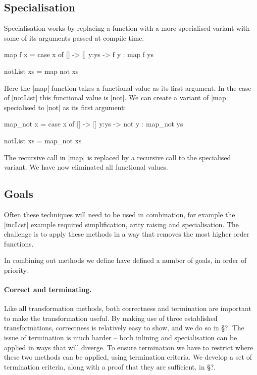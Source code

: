 \documentclass[preprint]{sigplanconf}
\begin{document}
\subsection{Specialisation}

Specialisation works by replacing a function with a more specialised variant with some of its arguments passed at compile time.

\begin{example}
\begin{code}
map f x = case  x of
                []    -> []
                y:ys  -> f y : map f ys

notList xs = map not xs
\end{code}

Here the |map| function takes a functional value as its first argument. In the case of |notList| this functional value is |not|. We can create a variant of |map| specialised to |not| as its first argument:

\begin{code}
map_not x = case  x of
                  []    -> []
                  y:ys  -> not y : map_not ys

notList xs = map_not xs
\end{code}

The recursive call in |map| is replaced by a recursive call to the specialised variant. We have now eliminated all functional values.
\end{example}

\subsection{Goals}

Often these techniques will need to be used in combination, for example the |incList| example required simplification, arity raising and specialisation. The challenge is to apply these methods in a way that removes the most higher order functions.

In combining out methods we define have defined a number of goals, in order of priority.

\paragraph{Correct and terminating.} Like all transformation methods, both correctness and termination are important to make the transformation useful. By making use of three established transformations, correctness is relatively easy to show, and we do so in \S?. The issue of termination is much harder -- both inlining and specialisation can be applied in ways that will diverge. To ensure termination we have to restrict where these two methods can be applied, using termination criteria. We develop a set of termination criteria, along with a proof that they are sufficient, in \S?.
\end{document}

